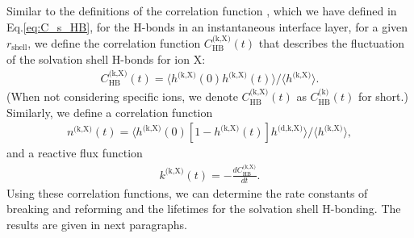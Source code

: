 Similar to the definitions of the correlation function \CSHB, which we have defined in Eq.\thinspace\ref{eq:C_s_HB}, for the H-bonds in an instantaneous interface layer, 
for a given $r_\text{shell}$, we define the correlation function $C^\text{(k,X)}_\text{HB}(t)$ that describes the fluctuation of the solvation shell H-bonds for ion X: 
\begin{eqnarray}
C^\text{(k,X)}_{\text{HB}}(t)=\langle h^\text{(k,X)}(0)h^\text{(k,X)}(t) \rangle/\langle h^\text{(k,X)}\rangle
\label{eq:C_k_HB}.
\end{eqnarray}
(When not considering specific ions, we denote $C^\text{(k,X)}_{\text{HB}}(t)$ as $C^{\text{(k)}}_\text{HB}(t)$ for short.)
%
Similarly, we define a correlation function 
\begin{eqnarray}
n^\text{(k,X)}(t)=\langle h^\text{(k,X)}(0)[1-h^\text{(k,X)}(t)]h^\text{(d,k,X)} \rangle/\langle h^\text{(k,X)}\rangle
\label{eq:n_k_HB},
\end{eqnarray}
and a reactive flux function
\begin{eqnarray}
k^\text{(k,X)}(t)= -\frac{dC_\text{HB}^\text{(k,X)}}{dt}
\label{eq:k_k_HB}.
\end{eqnarray}
Using these correlation functions, we can determine the rate constants of breaking and reforming and the lifetimes for the solvation shell H-bonding.
The results are given in next paragraphs.
%
